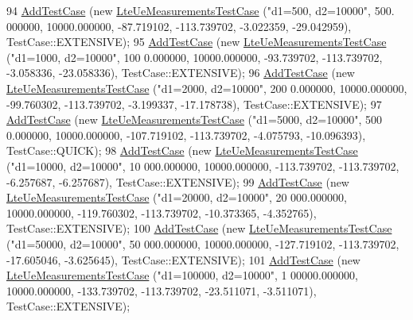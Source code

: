 \begin{DoxyCode}
94   \hyperlink{classns3_1_1TestCase_a3718088e3eefd5d6454569d2e0ddd835}{AddTestCase} (\textcolor{keyword}{new} \hyperlink{classLteUeMeasurementsTestCase}{LteUeMeasurementsTestCase} (\textcolor{stringliteral}{"d1=500, d2=10000"},  500.
      000000, 10000.000000, -87.719102, -113.739702, -3.022359, -29.042959), TestCase::EXTENSIVE);
95   \hyperlink{classns3_1_1TestCase_a3718088e3eefd5d6454569d2e0ddd835}{AddTestCase} (\textcolor{keyword}{new} \hyperlink{classLteUeMeasurementsTestCase}{LteUeMeasurementsTestCase} (\textcolor{stringliteral}{"d1=1000, d2=10000"},  100
      0.000000, 10000.000000, -93.739702, -113.739702, -3.058336, -23.058336), TestCase::EXTENSIVE);
96   \hyperlink{classns3_1_1TestCase_a3718088e3eefd5d6454569d2e0ddd835}{AddTestCase} (\textcolor{keyword}{new} \hyperlink{classLteUeMeasurementsTestCase}{LteUeMeasurementsTestCase} (\textcolor{stringliteral}{"d1=2000, d2=10000"},  200
      0.000000, 10000.000000, -99.760302, -113.739702, -3.199337, -17.178738), TestCase::EXTENSIVE);
97   \hyperlink{classns3_1_1TestCase_a3718088e3eefd5d6454569d2e0ddd835}{AddTestCase} (\textcolor{keyword}{new} \hyperlink{classLteUeMeasurementsTestCase}{LteUeMeasurementsTestCase} (\textcolor{stringliteral}{"d1=5000, d2=10000"},  500
      0.000000, 10000.000000, -107.719102, -113.739702, -4.075793, -10.096393), TestCase::QUICK);
98   \hyperlink{classns3_1_1TestCase_a3718088e3eefd5d6454569d2e0ddd835}{AddTestCase} (\textcolor{keyword}{new} \hyperlink{classLteUeMeasurementsTestCase}{LteUeMeasurementsTestCase} (\textcolor{stringliteral}{"d1=10000, d2=10000"},  10
      000.000000, 10000.000000, -113.739702, -113.739702, -6.257687, -6.257687), TestCase::EXTENSIVE);
99   \hyperlink{classns3_1_1TestCase_a3718088e3eefd5d6454569d2e0ddd835}{AddTestCase} (\textcolor{keyword}{new} \hyperlink{classLteUeMeasurementsTestCase}{LteUeMeasurementsTestCase} (\textcolor{stringliteral}{"d1=20000, d2=10000"},  20
      000.000000, 10000.000000, -119.760302, -113.739702, -10.373365, -4.352765), TestCase::EXTENSIVE);
100   \hyperlink{classns3_1_1TestCase_a3718088e3eefd5d6454569d2e0ddd835}{AddTestCase} (\textcolor{keyword}{new} \hyperlink{classLteUeMeasurementsTestCase}{LteUeMeasurementsTestCase} (\textcolor{stringliteral}{"d1=50000, d2=10000"},  50
      000.000000, 10000.000000, -127.719102, -113.739702, -17.605046, -3.625645), TestCase::EXTENSIVE);
101   \hyperlink{classns3_1_1TestCase_a3718088e3eefd5d6454569d2e0ddd835}{AddTestCase} (\textcolor{keyword}{new} \hyperlink{classLteUeMeasurementsTestCase}{LteUeMeasurementsTestCase} (\textcolor{stringliteral}{"d1=100000, d2=10000"},  1
      00000.000000, 10000.000000, -133.739702, -113.739702, -23.511071, -3.511071), TestCase::EXTENSIVE);

\end{DoxyCode}
